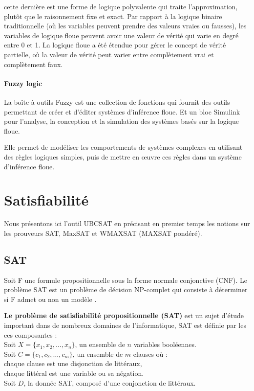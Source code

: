 cette dernière est une forme de logique polyvalente qui traite l’approximation, plutôt que le raisonnement fixe et exact. Par rapport à la logique binaire traditionnelle (où les variables peuvent prendre des valeurs vraies ou fausses), les variables de logique floue peuvent avoir une valeur de vérité qui varie en degré entre 0 et 1. La logique floue a été étendue pour gérer le concept de vérité partielle, où la valeur de vérité peut varier entre complètement vrai et complètement faux. 
\paragraph{Fuzzy logic} 
\vspace{1em}
La boîte à outils  Fuzzy est une collection de fonctions qui fournit des outils permettant de créer et d'éditer systèmes d'inférence floue. Et un bloc Simulink pour l'analyse, la conception et la simulation des systèmes basés sur la logique floue.

Elle permet de modéliser les comportements de systèmes complexes en utilisant des règles logiques simples, puis de mettre en œuvre ces règles dans un système d'inférence floue.

\section{Satisfiabilité}

Nous présentons ici l'outil UBCSAT en précisant en premier temps les notions sur les prouveurs SAT, MaxSAT et WMAXSAT (MAXSAT pondéré). 
\subsection{SAT}
Soit F une formule propositionnelle sous la forme normale conjonctive (CNF). Le problème SAT est un problème de décision NP-complet qui consiste à déterminer si F admet ou non un modèle \cite{hassenThesis}.

\textbf{Le problème de satisfiabilité propositionnelle (SAT)} est un sujet d'étude important dans de nombreux domaines de l'informatique, SAT est définie par les ces composantes :\\
\hspace{2em}Soit $X=\{x_1, x_2,\dots, x_n\}$, un ensemble de $n$ variables booléennes.\\
\hspace{2em}Soit $C=\{c_1, c_2,\dots, c_m\}$, un ensemble de $m$ clauses où :\\
\hspace{2em}chaque clause est une disjonction de littéraux,\\
\hspace{2em}chaque littéral est une variable ou sa négation.\\
\hspace{2em}Soit $D$, la donnée SAT, composé d'une conjonction de littéraux.

